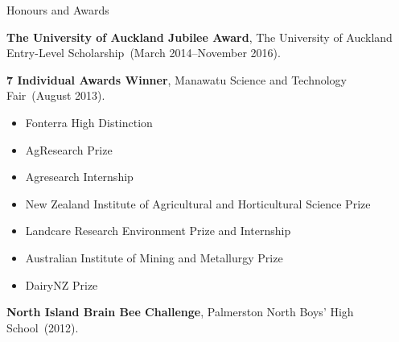 \documentclass[11pt]{tracv}
\begin{document}
\begin{hangingsection}{Honours and Awards}

		\hangingentry \textbf{The University of Auckland Jubilee Award}, The University of Auckland Entry-Level Scholarship~(March 2014--November 2016).

		\hangingentry \textbf{7 Individual Awards Winner}, Manawatu Science and Technology Fair~(August 2013).\\
		\begin{itemize}
		\item Fonterra High Distinction
		\item AgResearch Prize
		\item Agresearch Internship
		\item New Zealand Institute of Agricultural and Horticultural Science Prize
		\item Landcare Research Environment Prize and Internship
		\item Australian Institute of Mining and Metallurgy Prize
		\item DairyNZ Prize
		\end{itemize}
		
		\hangingentry \textbf{North Island Brain Bee Challenge}, Palmerston North Boys' High School~(2012).

\end{hangingsection}
\end{document}

